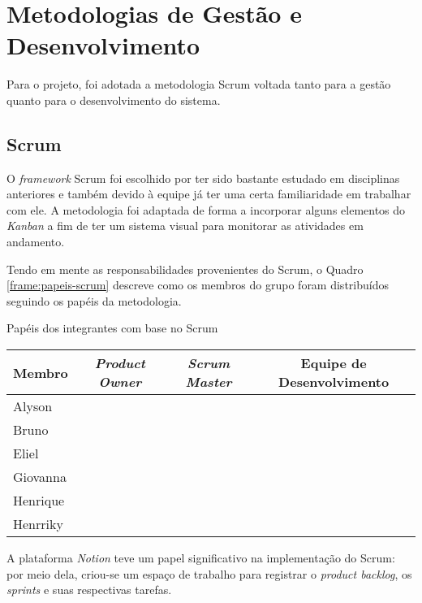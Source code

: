 \section{Metodologias de Gestão e Desenvolvimento}

Para o projeto, foi adotada a metodologia Scrum \cite{scrum-2024} voltada tanto para a gestão quanto para o desenvolvimento do sistema.

\subsection{Scrum}

O \textit{framework} Scrum foi escolhido por ter sido bastante estudado em disciplinas anteriores e também devido à equipe já ter uma certa familiaridade em trabalhar com ele. A metodologia foi adaptada de forma a incorporar alguns elementos do \emph{Kanban} \cite{kanban-2023} a fim de ter um sistema visual para monitorar as atividades em andamento.

Tendo em mente as responsabilidades provenientes do Scrum, o Quadro \ref{frame:papeis-scrum} descreve como os membros do grupo foram distribuídos seguindo os papéis da metodologia.

\begin{quadro}[ht]
	\setlength{\tabcolsep}{3pt}
	\begin{center}
		\caption{\label{frame:papeis-scrum}Papéis dos integrantes com base no Scrum}
		\begin{tabular}{|l|c|c|c|}
			\hline
			\textbf{Membro} & \textbf{\textit{Product Owner}} & \textbf{\textit{Scrum Master}} & \textbf{Equipe de Desenvolvimento} \\
			\hline
			Alyson &  & \checkmark & \checkmark \\
			\hline
			Bruno &  &  & \checkmark \\
			\hline
			Eliel &  &  & \checkmark \\
			\hline
			Giovanna &  &  & \checkmark \\
			\hline
			Henrique &  &  & \checkmark \\
			\hline
			Henrriky & \checkmark &  & \checkmark \\
			\hline
		\end{tabular}
	\end{center}
\end{quadro}

A plataforma \emph{Notion} \cite{notion-2025} teve um papel significativo na implementação do Scrum: por meio dela, criou-se um espaço de trabalho para registrar o \textit{product backlog}, os \textit{sprints} e suas respectivas tarefas.

